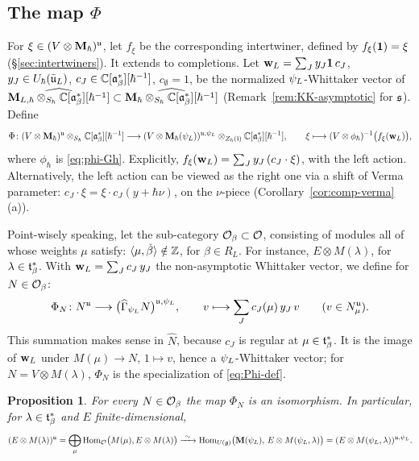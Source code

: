 \documentclass{article}
\theoremstyle{plain}
\newtheorem{proposition}[theorem]{Proposition}
\theoremstyle{definition}
\theoremstyle{remark}
\numberwithin{equation}{section}
\begin{document}
\subsection{The map \texorpdfstring{$\Phi$}{Phi}}\label{sec:Phi}
For $\xi\in(V\otimes\mathbf{M}_\hbar)^{\mathfrak{u}}$, let $f_\xi$ be the corresponding intertwiner, defined by $f_\xi(\mathbf 1)=\xi$ (\S\ref{sec:intertwiners}). It extends to completions. Let $\mathbf w_L=\sum_J y_J\mathbf 1\,c_J$, $y_J\in U_\hbar(\bar{\mathfrak{u}}_L)$, $c_J\in\mathbb{C}[\mathfrak{a}^*_{\beta}][\hbar^{-1}]$, $c_\emptyset=1$, be the normalized $\psi_L$-Whittaker vector of $\widehat{\mathbf{M}_{L,\hbar}\otimes_{S_\hbar}\mathbb{C}[\mathfrak{a}^*_{\beta}][\hbar^{-1}]}\subset\widehat{\mathbf{M}_\hbar\otimes_{S_\hbar}\mathbb{C}[\mathfrak{a}^*_{\beta}][\hbar^{-1}]}$ (Remark~\ref{rem:KK-asymptotic} for $\mathfrak{s}$). Define
\begin{equation}\label{eq:Phi-def}
\Phi\colon(V\otimes\mathbf{M}_\hbar)^{\mathfrak{u}}\otimes_{S_\hbar}\mathbb{C}[\mathfrak{a}^*_{\beta}][\hbar^{-1}]\longrightarrow(V\otimes\mathbf{M}_\hbar(\psi_L))^{\mathfrak{u},\psi_L}\otimes_{Z_\hbar(\mathfrak{l})}\mathbb{C}[\mathfrak{a}^*_{\beta}][\hbar^{-1}],\qquad
\xi\longmapsto(V\otimes\phi_\hbar)^{-1}\bigl(f_\xi(\mathbf w_L)\bigr),
\end{equation}
where $\phi_\hbar$ is \eqref{eq:phi-Gh}. Explicitly, $f_\xi(\mathbf w_L)=\sum_Jy_J\,(c_J\cdot\xi)$, with the left action. Alternatively, the left action can be viewed as the right one via a shift of Verma parameter: $c_J\cdot\xi=\xi\cdot c_J(y+\hbar\nu)$, on the $\nu$-piece (Corollary~\ref{cor:comp-verma}(a)).

Point-wisely speaking, let the sub-category $\mathcal{O}_\beta\subset\mathcal{O}$, consisting of modules all of whose weights $\mu$ satisfy: $\langle\mu,\check\beta\rangle\notin\mathbb{Z}$, for $\beta\in R_L$. For instance, $E\otimes M(\lambda)$, for $\lambda\in\mathfrak{t}^*_\beta$. With $\mathbf w_L=\sum_J c_J\,y_J$ the non-asymptotic Whittaker vector, we define for $N\in\mathcal{O}_\beta$:
\begin{equation}\label{eq:Phi}
\Phi_N\colon N^{\mathfrak{u}}\longrightarrow\bigl(\widehat\Gamma_{\psi_L}N\bigr)^{\mathfrak{u},\psi_L},\qquad
v\longmapsto\sum_Jc_J(\mu)\,y_J\,v\qquad(v\in N^{\mathfrak{u}}_\mu).
\end{equation}
This summation makes sense in $\widehat N$, because $c_J$ is regular at $\mu\in\mathfrak{t}^*_\beta$. It is the image of $\mathbf w_L$ under $M(\mu)\to N$, $1\mapsto v$, hence a $\psi_L$-Whittaker vector; for $N=V\otimes M(\lambda)$, $\Phi_N$ is the specialization of \eqref{eq:Phi-def}.

\begin{proposition}\label{prop:Phi-iso}
For every $N\in\mathcal{O}_\beta$ the map $\Phi_N$ is an isomorphism. In particular, for $\lambda\in\mathfrak{t}^*_\beta$ and $E$ finite-dimensional,
\[
(E\otimes M(\lambda))^{\fraku}=\bigoplus_\mu\Hom_{\calO}\bigl(M(\mu),E\otimes M(\lambda)\bigr)\xrightarrow{\ \sim\ }\Hom_{U(\frakg)}\bigl(\bM(\psiL),\,E\otimes M(\psiL,\lambda)\bigr)=(E\otimes M(\psiL,\lambda))^{\fraku,\psiL}.
\]
\end{proposition}
\end{document}
